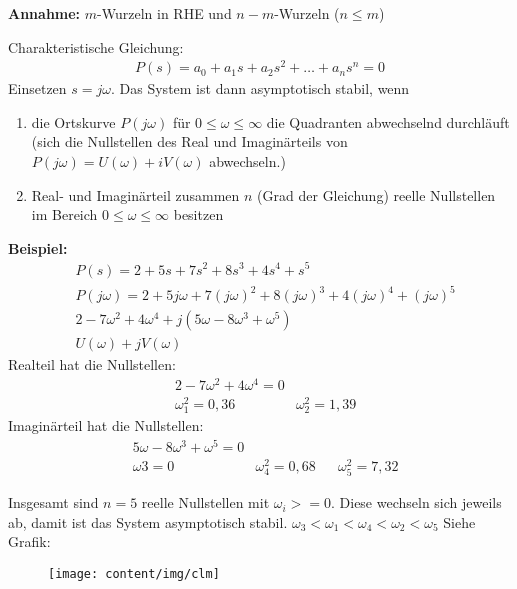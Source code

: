 \begin{tcolorbox}[colback=white!10!white,colframe=green!30!black,title=CLM Kriterium] 
	\textbf{Annahme:}
	$m$-Wurzeln in RHE  und $n-m$-Wurzeln ($n \leq m$)
	
	Charakteristische Gleichung:
	\begin{align*}
		P(s) = a_0 + a_1s + a_2s^2 + \ldots + a_n s^n = 0 
	\end{align*}
	Einsetzen $s = j\omega$. 
	Das System ist dann asymptotisch stabil, wenn
	\begin{enumerate}
		\item die Ortskurve $P(j\omega)$  für $0 \leq \omega \leq \infty$ die Quadranten abwechselnd durchläuft (sich die Nullstellen des Real und Imaginärteils von $P(j\omega) = U(\omega)+iV(\omega)$ abwechseln.) 
		\item Real- und Imaginärteil zusammen $n$ (Grad der Gleichung) reelle Nullstellen im Bereich $0 \leq \omega \leq \infty$ besitzen 
	\end{enumerate} 
	
	
	
	
	\tcblower
	
	\textbf{Beispiel:}
	\begin{align*}
		&P(s) = 2 + 5s +7s^2 +8s^3 +4s^4 +s^5\\
		&P(j\omega) = 2 + 5j\omega + 7(j\omega)^2 +8 (j\omega)^3 + 4 (j\omega)^4 + (j\omega)^5\\
		&2-7\omega^2 +4\omega^4 + j (5\omega - 8\omega^3 +\omega^5)\\
		&U(\omega) + jV(\omega)
	\end{align*}
	Realteil hat die Nullstellen:
	\begin{align*}
		&2-7\omega^2 +4\omega^4 = 0 \\
		&\omega_1^2 = 0,36 & \omega_2^2= 1,39
	\end{align*}
		Imaginärteil hat die Nullstellen:
		\begin{align*}
		&5\omega - 8\omega^3 +\omega^5= 0 \\
		&\omega3 = 0  & \omega_4^2= 0,68 & & \omega_5^2= 7,32 
		\end{align*}
		
		Insgesamt sind $n=5$ reelle Nullstellen mit $\omega_i >= 0$. Diese wechseln sich jeweils ab, damit ist das System asymptotisch stabil. $\omega_3 < \omega_1 < \omega_4 < \omega_2 < \omega_5$ Siehe Grafik:
		\begin{figure}[H]
\centering
\texttt{[image: content/img/clm]}
\label{fig:clm}
\end{figure}

		
\end{tcolorbox}